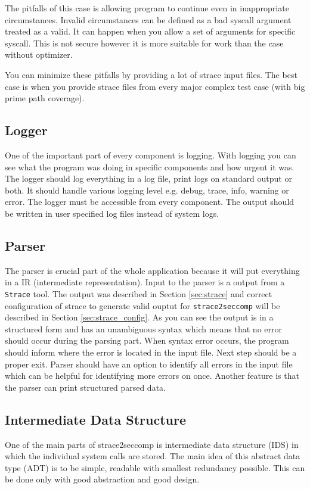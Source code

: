The pitfalls of this case is allowing program to continue even in inappropriate circumstances.
Invalid circumstances can be defined as a bad syscall argument treated as a valid.
It can happen when you allow a set of arguments for specific syscall.
This is not secure however it is more suitable for work than the case without optimizer.

You can minimize these pitfalls by providing a lot of strace input files.
The best case is when you provide strace files from every major complex test case (with big prime path coverage).

\subsection{Logger}
One of the important part of every component is logging.
With logging you can see what the program was doing in specific components and how urgent it was.
The logger should log everything in a log file, print logs on standard output or both.
It should handle various logging level e.g. debug, trace, info, warning or error.
The logger must be accessible from every component.
The output should be written in user specified log files instead of system logs.


\subsection{Parser}
The parser is crucial part of the whole application because it will put everything in a IR (intermediate representation).
Input to the parser is a output from a \texttt{Strace} tool.
The output was described in Section \ref{sec:strace} and correct configuration of strace to generate valid ouptut for \texttt{strace2seccomp} will be described in Section \ref{sec:strace_config}.
As you can see the output is in a structured form and has an unambiguous syntax which means that no error should occur during the parsing part.
When syntax error occurs, the program should inform where the error is located in the input file.
Next step should be a proper exit.
Parser should have an option to identify all errors in the input file which can be helpful for identifying more errors on once.
Another feature is that the parser can print structured parsed data.

\subsection{Intermediate Data Structure}
One of the main parts of strace2seccomp is intermediate data structure (IDS) in which the individual system calls are stored.
The main idea of this abstract data type (ADT) is to be simple, readable with smallest redundancy possible.
This can be done only with good abstraction and good design.

